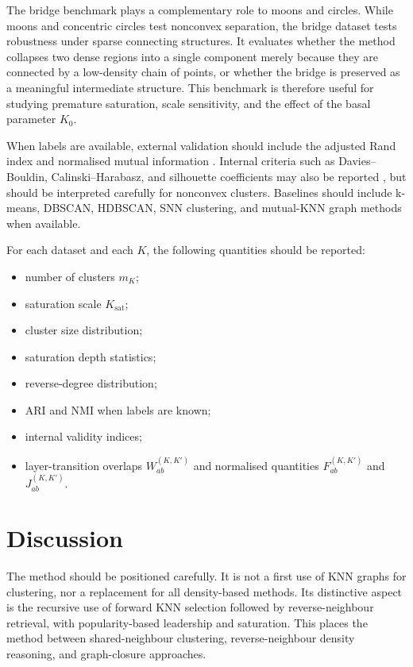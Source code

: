 \documentclass[pdflatex,sn-mathphys-num]{sn-jnl}
\begin{document}
The bridge benchmark plays a complementary role to moons and circles. While moons and concentric circles test nonconvex separation, the bridge dataset tests robustness under sparse connecting structures. It evaluates whether the method collapses two dense regions into a single component merely because they are connected by a low-density chain of points, or whether the bridge is preserved as a meaningful intermediate structure. This benchmark is therefore useful for studying premature saturation, scale sensitivity, and the effect of the basal parameter $K_0$.

When labels are available, external validation should include the adjusted Rand index and normalised mutual information \citep{HubertArabie1985,VinhEppsBailey2010}. Internal criteria such as Davies--Bouldin, Calinski--Harabasz, and silhouette coefficients may also be reported \citep{DaviesBouldin1979,CalinskiHarabasz1974,Rousseeuw1987}, but should be interpreted carefully for nonconvex clusters. Baselines should include k-means, DBSCAN, HDBSCAN, SNN clustering, and mutual-KNN graph methods when available.

For each dataset and each $K$, the following quantities should be reported:
\begin{itemize}
    \item number of clusters $m_K$;
    \item saturation scale $K_{\mathrm{sat}}$;
    \item cluster size distribution;
    \item saturation depth statistics;
    \item reverse-degree distribution;
    \item ARI and NMI when labels are known;
    \item internal validity indices;
    \item layer-transition overlaps $W_{ab}^{(K,K')}$ and normalised quantities $F_{ab}^{(K,K')}$ and $J_{ab}^{(K,K')}$.
\end{itemize}

\section{Discussion}\label{sec:discussion}

The method should be positioned carefully. It is not a first use of KNN graphs for clustering, nor a replacement for all density-based methods. Its distinctive aspect is the recursive use of forward KNN selection followed by reverse-neighbour retrieval, with popularity-based leadership and saturation. This places the method between shared-neighbour clustering, reverse-neighbour density reasoning, and graph-closure approaches.
\end{document}
